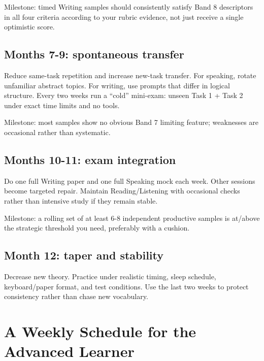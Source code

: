 \documentclass[11pt,a4paper]{article}
\begin{document}
Milestone: timed Writing samples should consistently satisfy Band 8 descriptors in all four criteria according to your rubric evidence, not just receive a single optimistic score.

\subsection{Months 7-9: spontaneous transfer}
Reduce same-task repetition and increase new-task transfer. For speaking, rotate unfamiliar abstract topics. For writing, use prompts that differ in logical structure. Every two weeks run a ``cold'' mini-exam: unseen Task 1 + Task 2 under exact time limits and no tools.

Milestone: most samples show no obvious Band 7 limiting feature; weaknesses are occasional rather than systematic.

\subsection{Months 10-11: exam integration}
Do one full Writing paper and one full Speaking mock each week. Other sessions become targeted repair. Maintain Reading/Listening with occasional checks rather than intensive study if they remain stable.

Milestone: a rolling set of at least 6-8 independent productive samples is at/above the strategic threshold you need, preferably with a cushion.

\subsection{Month 12: taper and stability}
Decrease new theory. Practice under realistic timing, sleep schedule, keyboard/paper format, and test conditions. Use the last two weeks to protect consistency rather than chase new vocabulary.

\section{A Weekly Schedule for the Advanced Learner}
\end{document}
